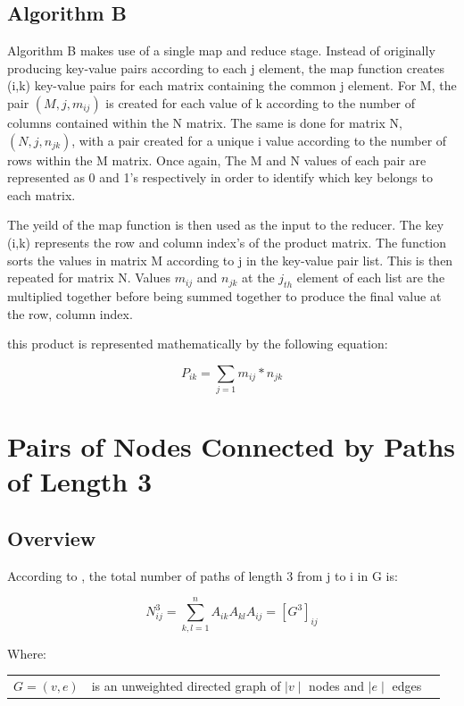 \documentclass[10pt,twocolumn]{witseiepaper}
\begin{document}
\subsection{Algorithm B}

Algorithm B makes use of a single map and reduce stage. Instead of originally producing key-value pairs according to each j element, the map function creates (i,k) key-value pairs for each matrix containing the common j element. For M, the pair  $(M, j, m_{ij})$ is created for each value of k according to the number of columns contained within the N matrix. The same is done for matrix N, $(N, j,n_{jk})$, with a pair created for a unique i value according to the number of rows within the M matrix. Once again, The M and N values of each pair are represented as 0 and 1's respectively in order to identify which key belongs to each matrix.
	
The yeild of the map function is then used as the input to the reducer. The key (i,k) represents the row and column index's of the product matrix. The function sorts the values in matrix M according to j in the key-value pair list. This is then repeated for matrix N. Values $m_{ij}$ and $n_{jk}$ at the $j_{th}$ element of each list are the multiplied together before being summed together to produce the final value at the row, column index. 

this product is represented mathematically by the following equation:

 \begin{equation}
P_{ik}= \sum _{j = 1} m_{ij} * n_{jk}
\label{eqn:multiply}
\end{equation}

\section{Pairs of Nodes Connected by Paths of Length 3}
\subsection{Overview}
According to \cite{pathLength3}, the total number of paths of length 3 from j to i in G is:

 \begin{equation}
N_{ij}^{3} = \sum _{k,l = 1}^{n} A_{ik}A_{kl}A_{ij} = [G^{3}]_{ij}
\label{eqn:multiply}
\end{equation}

Where:
\begin{tabular}{lll}
	$G = (v,e)$           &  is an unweighted directed graph of $\mid v \mid$ nodes and $\mid e \mid$ edges \\
\end{tabular}
\end{document}
